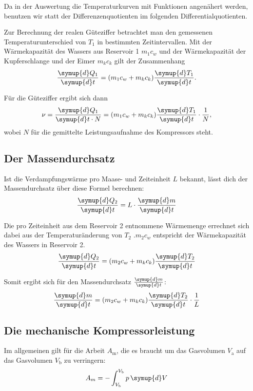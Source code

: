Da in der Auswertung die Temperaturkurven mit Funktionen angenähert werden, benutzen wir statt der Differenzenquotienten im folgenden Differentialquotienten.

Zur Berechnung der realen Güteziffer betrachtet man den gemessenen Temperaturunterschied von $T_1$ in bestimmten Zeitintervallen.
Mit der Wärmekapazität des Wassers aus Reservoir 1 $m_1c_w$ und der Wärmekapazität der Kupferschlange und der Eimer $m_kc_k$ gilt der Zusammenhang
\begin{equation}
    \frac{\symup{d}Q_1}{\symup{d}t} = (m_1c_w + m_kc_k) \frac{\symup{d}T_1}{\symup{d}t}.
\end{equation}

Für die Güteziffer ergibt sich dann 
\begin{equation}\label{eqn:gueteziffer}
    \nu = \frac{\symup{d}Q_1}{\symup{d}t \cdot N} = (m_1c_w + m_kc_k) \frac{\symup{d}T_1}{\symup{d}t} \cdot \frac{1}{N},
\end{equation}
wobei $N$ für die gemittelte Leistungsaufnahme des Kompressors steht.

\subsection{Der Massendurchsatz}
Ist die Verdampfungswärme pro Maase- und Zeiteinheit $L$ bekannt, lässt dich der Massendurchsatz über diese Formel berechnen:
\begin{equation}
    \frac{\symup{d}Q_2}{\symup{d}t} = L \cdot \frac{\symup{d}m}{\symup{d}t}
\end{equation}

Die pro Zeiteinheit aus dem Reservoir 2 entnommene Wärmemenge errechnet sich dabei aus der Temperaturänderung von $T_2$ .$m_2c_w$ entspricht der Wärmekapazität des Wassers in Reservoir 2.
\begin{equation}
    \frac{\symup{d}Q_2}{\symup{d}t} = (m_2c_w + m_kc_k) \frac{\symup{d}T_2}{\symup{d}t}
\end{equation}

Somit ergibt sich für den Massendurchsatz $\frac{\symup{d}m}{\symup{d}t}$:
\begin{equation}\label{eqn:massendurchsatz}
    \frac{\symup{d}m}{\symup{d}t} = (m_2c_w + m_kc_k) \frac{\symup{d}T_2}{\symup{d}t} \cdot \frac{1}{L}
\end{equation}

\subsection{Die mechanische Kompressorleistung}
Im allgemeinen gilt für die Arbeit $A_{\text{m}}$, die es braucht um das Gasvolumen $V_{\text{a}}$ auf das Gasvolumen $V_{\text{b}}$ zu verringern: 
\begin{equation*}
    A_m = - \int_{V_{\text{b}}}^{V_{\text{b}}} p\, \symup{d}V
\end{equation*}

